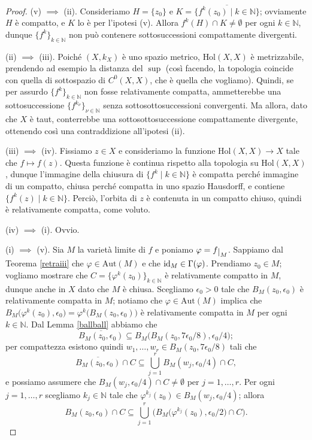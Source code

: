 \begin{proof}
    (v) $\implies$ (ii). Consideriamo $H=\{z_0\}$ e $K=\overline{\{f^k(z_0)\mid k\in\mathbb{N}\}}$; ovviamente $H$ è compatto, e $K$ lo è per l'ipotesi (v). Allora $f^k(H)\cap K\not=\emptyset$ per ogni $k\in\mathbb{N}$, dunque $\{f^k\}_{k \in \mathbb{N}}$ non può contenere sottosuccessioni compattamente divergenti.

    (ii) $\implies$ (iii). Poiché $(X,k_X)$ è uno spazio metrico, $\text{Hol}(X,X)$ è metrizzabile, prendendo ad esempio la distanza del $\sup$ (così facendo, la topologia coincide con quella di sottospazio di $C^0(X,X)$, che è quella che vogliamo). Quindi, se per assurdo $\{f^k\}_{k \in \mathbb{N}}$ non fosse relativamente compatta, ammetterebbe una sottosuccessione $\{f^{k_\nu}\}_{\nu\in\mathbb{N}}$ senza sottosottosuccessioni convergenti. Ma allora, dato che $X$ è taut, conterrebbe una sottosottosuccessione compattamente divergente, ottenendo così una contraddizione all'ipotesi (ii).

    (iii) $\implies$ (iv). Fissiamo $z\in X$ e consideriamo la funzione $\text{Hol}(X,X)\longrightarrow X$ tale che $f\longmapsto f(z)$. Questa funzione è continua rispetto alla topologia su $\text{Hol}(X,X)$, dunque l'immagine della chiusura di $\{f^k\mid k\in\mathbb{N}\}$ è compatta perché immagine di un compatto, chiusa perché compatta in uno spazio Hausdorff, e contiene $\{f^k(z)\mid k\in\mathbb{N}\}$. Perciò, l'orbita di $z$ è contenuta in un compatto chiuso, quindi è relativamente compatta, come voluto.

    (iv) $\implies$ (i). Ovvio.

    (i) $\implies$ (v). Sia $M$ la varietà limite di $f$ e poniamo $\varphi=f\restrict{M}$. Sappiamo dal Teorema \ref{retraiii} che $\varphi\in\text{Aut}(M)$ e che $\operatorname{id}_M\in\Gamma(\varphi)$. Prendiamo $z_0 \in M$; vogliamo mostrare che $C=\{\varphi^k(z_0)\}_{k\in\mathbb{N}}$ è relativamente compatto in $M$, dunque anche in $X$ dato che $M$ è chiusa. Scegliamo $\epsilon_0>0$ tale che $B_M(z_0,\epsilon_0)$ è relativamente compatta in $M$; notiamo che $\varphi\in\text{Aut}(M)$ implica che $B_M\big(\varphi^k(z_0),\epsilon_0\big)=\varphi^k\big(B_M(z_0,\epsilon_0)\big)$ è relativamente compatta in $M$ per ogni $k \in \mathbb{N}$. Dal Lemma \ref{ballball} abbiamo che
    $$\overline{B_M(z_0,\epsilon_0)} \subseteq B_M\big(B_M(z_0,7\epsilon_0/8),\epsilon_0/4\big);$$
    per compattezza esistono quindi $w_1,\dots,w_r \in B_M(z_0,7\epsilon_0/8)$ tali che
    $$\overline{B_M(z_0,\epsilon_0)}\cap C\subseteq \bigcup_{j=1}^r B_M(w_j,\epsilon_0/4)\cap C,$$
    e possiamo assumere che $B_M(w_j,\epsilon_0/4)\cap C\not=\emptyset$ per $j=1,\dots,r$.
    Per ogni $j=1,\dots, r$ scegliamo $k_j\in\mathbb{N}$ tale che $\varphi^{k_j}(z_0)\in B_M(w_j,\epsilon_0/4)$; allora
    \begin{equation}\label{capci}
        B_M(z_0,\epsilon_0)\cap C \subseteq \bigcup_{j=1}^r \Big(B_M\big(\varphi^{k_j}(z_0),\epsilon_0/2\big)\cap C\Big).
    \end{equation}


\end{proof}
